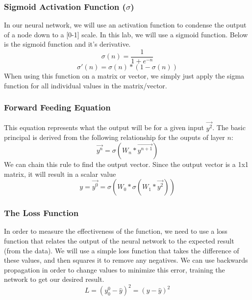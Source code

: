 \documentclass[10pt]{article}
\begin{document}
\subsubsection{Sigmoid Activation Function ($\sigma$)}
In our neural network, we will use an activation function to condense the output of a node down to a [0-1] scale. In this lab, we will use a sigmoid function. Below is the sigmoid function and it's derivative.
$$\sigma(n) = \frac{1}{1 + e^{-n}}$$
$$\sigma'(n) = \sigma(n) * (1 - \sigma(n))$$
When using this function on a matrix or vector, we simply just apply the sigma function for all individual values in the matrix/vector.

\subsubsection{Forward Feeding Equation}
This equation represents what the output will be for a given input $\vec{y^2}$. The basic principal is derived from the following relationship for the ouputs of layer $n$:
$$\vec{y^n} = \sigma(W_{n} * \vec{y^{n+1}})$$
We can chain this rule to find the output vector. Since the output vector is a 1x1 matrix, it will result in a scalar value
$$y = \vec{y^0} = \sigma(W_0 * \sigma(W_1 * \vec{y^2}))$$
\subsubsection{The Loss Function}
In order to measure the effectiveness of the function, we need to use a loss function that relates the output of the neural network to the expected result (from the data). We will use a simple loss function that takes the difference of these values, and then squares it to remove any negatives. We can use backwards propagation in order to change values to minimize this error, training the network to get our desired result.
$$L = (y^0_0 - \hat{y})^2 = (y - \hat{y})^2$$
\end{document}
